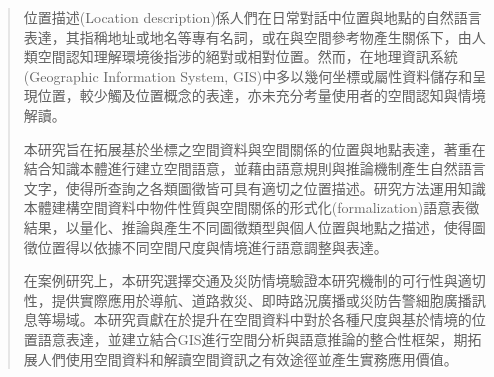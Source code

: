 
\begin{abstract}

位置描述(Location description)係人們在日常對話中位置與地點的自然語言表達，其指稱地址或地名等專有名詞，或在與空間參考物產生關係下，由人類空間認知理解環境後指涉的絕對或相對位置。然而，在地理資訊系統(Geographic Information System, GIS)中多以幾何坐標或屬性資料儲存和呈現位置，較少觸及位置概念的表達，亦未充分考量使用者的空間認知與情境解讀。

本研究旨在拓展基於坐標之空間資料與空間關係的位置與地點表達，著重在結合知識本體進行建立空間語意，並藉由語意規則與推論機制產生自然語言文字，使得所查詢之各類圖徵皆可具有適切之位置描述。研究方法運用知識本體建構空間資料中物件性質與空間關係的形式化(formalization)語意表徵結果，以量化、推論與產生不同圖徵類型與個人位置與地點之描述，使得圖徵位置得以依據不同空間尺度與情境進行語意調整與表達。

在案例研究上，本研究選擇交通及災防情境驗證本研究機制的可行性與適切性，提供實際應用於導航、道路救災、即時路況廣播或災防告警細胞廣播訊息等場域。本研究貢獻在於提升在空間資料中對於各種尺度與基於情境的位置語意表達，並建立結合GIS進行空間分析與語意推論的整合性框架，期拓展人們使用空間資料和解讀空間資訊之有效途徑並產生實務應用價值。


\end{abstract}

